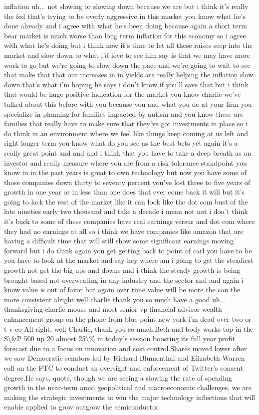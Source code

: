 \documentclass{article}%
\begin{document}
inflation uh... not slowing or slowing down because we are but i think it's really the fed that's trying to be overly aggressive in this market you know what he's done already and i agree with what he's been doing because again a short term bear market is much worse than long term inflation for this economy so i agree with what he's doing but i think now it's time to let all these raises seep into the market and slow down to what i'd love to see him say is that we may have more work to go but we're going to slow down the pace and we're going to wait to see that make that that our increases in in yields are really helping the inflation slow down that's what i'm hoping he says i don't know if you'll save that but i think that would be huge positive indication for the market you know charlie we've talked about this before with you because you and what you do at your firm you specialize in planning for families impacted by autism and you know these are families that really have to make sure that they've got investments in place so i do think in an environment where we feel like things keep coming at us left and right longer term you know what do you see as the best bets yet again it's a really great point and and and i think that you have to take a deep breath as an investor and really measure where you are from a risk tolerance standpoint you know in in the past years is great to own technology but now you have some of those companies down thirty to seventy percent you've lost three to five years of growth in one year or in less than one does that ever come back it will but it's going to lack the rest of the market like it can look like the dot com bust of the late nineties early two thousand and take a decade i mean not not i don't think it's back to some of these companies have real earnings versus and dot com where they had no earnings at all so i think we have companies like amazon that are having a difficult time that will still show some significant earnings moving forward but i do think again you get getting back to point of carl you have to be you have to look at the market and say hey where am i going to get the steadiest growth not get the big ups and downs and i think the steady growth is being brought based not overweating in any industry and the sector and and again i know value is out of favor but again over time value will be more the can the more consistent alright well charlie thank you so much have a good uh... thanksgiving charlie mouse and most senior vp financial advisor wealth enhancement group on the phone from blue point new york i'm dead over two or t{-}v co  All right, well Charlie, thank you so much.Beth and body works top in the S\textbackslash{}\&P 500 up 20 almost 25\textbackslash{}\% in today's session boosting its full year profit forecast due to a focus on innovation and cost control.Shares moved lower after we saw Democratic senators led by Richard Blumenthal and Elizabeth Warren call on the FTC to conduct an oversight and enforcement of Twitter's consent degree.He says, quote, though we are seeing a slowing the rate of spending growth in the near{-}term amid geopolitical and macroeconomic challenges, we are making the strategic investments to win the major technology inflections that will enable applied to grow outgrow the semiconductor 
\end{document}
